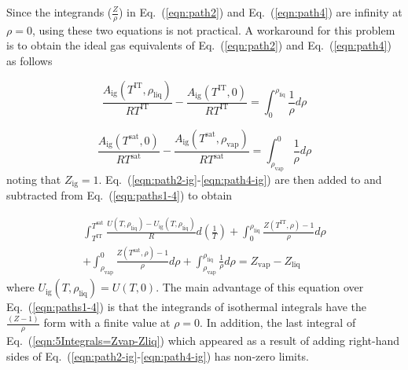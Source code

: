 \documentclass[5p,times]{elsarticle}
\begin{document}
Since the integrands ($\frac{Z}{\rho}$) in Eq.~(\ref{eqn:path2}) and Eq.~(\ref{eqn:path4}) are infinity at $\rho=0$, using these two equations is not practical. A workaround for this problem is to obtain the ideal gas equivalents of Eq.~(\ref{eqn:path2}) and Eq.~(\ref{eqn:path4}) as follows

\begin{equation}
\frac{A_\mathrm{ig}(T^\mathrm{IT},\rho_\mathrm{liq})}{RT^\mathrm{IT}}
-
\frac{A_\mathrm{ig}(T^\mathrm{IT},0)}{RT^\mathrm{IT}}
=
\int _{0}^{\rho_\mathrm{liq}} \frac{1}{\rho}  d\rho
\label{eqn:path2-ig}
\end{equation}

\begin{equation}
\frac{A_\mathrm{ig}(T^\mathrm{sat},0)}{RT^\mathrm{sat}}
-
\frac{A_\mathrm{ig}(T^\mathrm{sat},\rho_\mathrm{vap})}{RT^\mathrm{sat}}
=
\int _{\rho_\mathrm{vap}}^{0} \frac{1}{\rho}  d\rho
\label{eqn:path4-ig}
\end{equation} 
noting that $Z_\mathrm{ig}=1$. Eq.~(\ref{eqn:path2-ig}-\ref{eqn:path4-ig}) are then added to and subtracted from Eq.~(\ref{eqn:paths1-4}) to obtain


\begin{equation}
\begin{array}{l}
\int _{T^\mathrm{IT}}^{T^\mathrm{sat}} \frac{U(T,\rho_\mathrm{liq})-U_\mathrm{ig}(T,\rho_\mathrm{liq})}{R}  d\left(\frac{1}{T}\right)+\int _{0}^{\rho_\mathrm{liq}} \frac{Z(T^\mathrm{IT},\rho)-1}{\rho}  d\rho 
\\
+\int _{\rho_\mathrm{vap}}^{0} \frac{Z(T^\mathrm{sat},\rho)-1}{\rho}  d\rho+ \int _{\rho_\mathrm{vap}}^{\rho_\mathrm{liq}} \frac{1}{\rho}  d\rho =Z_\mathrm{vap} - Z_\mathrm{liq} 
\end{array}
\label{eqn:5Integrals=Zvap-Zliq}
\end{equation}
where $U_\mathrm{ig}(T,\rho_\mathrm{liq})=U(T,0)$. The main advantage of this equation over Eq.~(\ref{eqn:paths1-4}) is that the integrands of isothermal integrals have the $\frac{(Z-1)}{\rho}$ form with a finite value at $\rho=0$.  In addition, the last integral of Eq.~(\ref{eqn:5Integrals=Zvap-Zliq}) which appeared as a result of adding right-hand sides of Eq.~(\ref{eqn:path2-ig}-\ref{eqn:path4-ig}) has non-zero limits.
\end{document}
